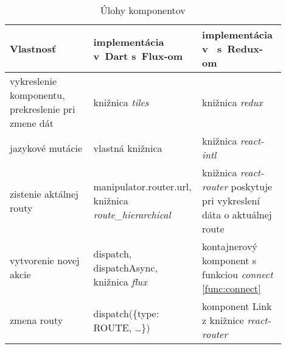 \begin{comment}
\paragraph{Komponenty v JavaScripte s Redux-om}
V JavaScriptovej aplikácii máme dva typy komponentov: kontajnerové a prezenčné. 

Prezenčné sú jednoduchšie, priamočiarejšie. Všetky parametre, ktoré potrebujú, by mali dostať od volajúceho komponentu (vrátane funkcií na vytváranie akcií). Nemajú prístup ku celému stavu aplikácie. Mali by to byť hlavne znovu použiteľné komponenty (napríklad riadok tabuľky).

Kontajnerové komponenty sú o niečo zložitejšie. Majú prístup ku celému stavu aplikácie, z ktorého si vyberajú len potrebné časti. Na to nám pomáha funkcia \emph{connect} z knižnice \emph{react-redux}. Kontajnerový komponent vyzerá podobne ako prezenčný, tiež všetko vykresľuje len zo svojich parametrov. 
Funkcia \emph{connect} tvorí medzivrstvu medzi týmto komponentom a jeho exportovaným variantom. Do tohoto komponentu doplní potrebné dáta zo stavu. Tieto komponenty sú však menej univerzálne, keďže sú viazané na konkrétne dáta zo stavu.
\end{comment}

\begin{table}
  \caption{Úlohy komponentov}
  \label{table:components}
  \begin{tabular}{| p{0.3\linewidth} | p{0.3\linewidth} | p{0.3\linewidth} |}
   \hline
     Vlastnosť & implementácia v~Dart s~Flux-om & implementácia v~\JS{} s~Redux-om \\
    \hline
    \hline
     vykreslenie komponentu, prekreslenie pri zmene dát & 
     knižnica \emph{tiles} &
     knižnica \emph{redux} \\
    \hline
     jazykové mutácie & 
     vlastná knižnica & 
     knižnica \emph{react-intl} \\
    \hline
     zistenie aktálnej routy & 
     manipulator.router.url, knižnica \emph{route\_hierarchical} & 
     knižnica \emph{react-router} poskytuje pri vykreslení dáta o aktuálnej route \\
    \hline
     vytvorenie novej akcie & 
     dispatch, dispatchAsync, knižnica \emph{flux} & 
     kontajnerový komponent s funkciou \emph{connect} \ref{func:connect} \\
    \hline
     zmena routy & 
     dispatch(\{type: ROUTE, \ldots\}) & 
     komponent Link z knižnice \emph{react-router} \\
    \hline
   \end{tabular}
\end{table}

